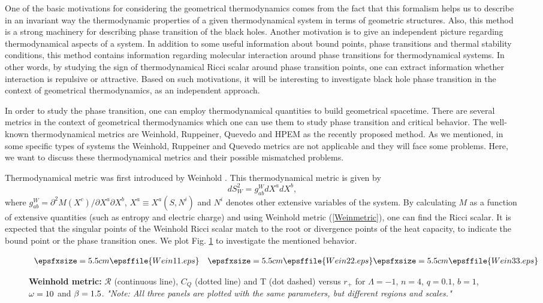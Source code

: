 \documentclass[aps,onecolumn ]{revtex4}
\begin{document}
One of the basic motivations for considering the geometrical
thermodynamics comes from the fact that this formalism helps us to
describe in an invariant way the thermodynamic properties of a
given thermodynamical system in terms of geometric structures.
Also, this method is a strong machinery for describing phase
transition of the black holes. Another motivation is to give an
independent picture regarding thermodynamical aspects of a system.
In addition to some useful information about bound points, phase
transitions and thermal stability conditions, this method contains
information regarding molecular interaction around phase
transitions for thermodynamical systems. In other words, by
studying the sign of thermodynamical Ricci scalar around phase
transition points, one can extract information whether interaction
is repulsive or attractive. Based on such motivations, it will be
interesting to investigate black hole phase transition in the
context of geometrical thermodynamics, as an independent approach.

In order to study the phase transition, one can employ
thermodynamical quantities to build geometrical spacetime. There
are several metrics in the context of geometrical thermodynamics
which one can use them to study phase transition and critical
behavior. The well-known thermodynamical metrics are Weinhold,
Ruppeiner, Quevedo and HPEM as the recently proposed method. As we
mentioned, in some specific types of systems the Weinhold,
Ruppeiner and Quevedo metrics are not applicable and they will
face some problems. Here, we want to discuss these thermodynamical
metrics and their possible mismatched problems.

Thermodynamical metric was first introduced by Weinhold
\cite{Weinhold1,Weinhold2}. This thermodynamical metric is given
by
\begin{equation}
dS_{W}^{2}=g_{ab}^{W}dX^{a}dX^{b},  \label{Weinmetric}
\end{equation}
where $g_{ab}^{W}=\partial ^{2}M\left( X^{c}\right) /\partial
X^{a}\partial X^{b}$, $X^{a}\equiv X^{a}\left( S,N^{i}\right) $
and $N^{i}$ denotes other extensive variables of the system. By
calculating $M$ as a function of extensive quantities (such as
entropy and electric charge) and using Weinhold metric
(\ref{Weinmetric}), one can find the Ricci scalar. It is expected
that the singular points of the Weinhold Ricci scalar match to the
root or divergence points of the heat capacity, to indicate the
bound point or the phase transition ones. We plot Fig. \ref{FigW}
to investigate the mentioned behavior.
\begin{figure}[tbp]
$%
\begin{array}{cc}
\epsfxsize=5.5cm \epsffile{Wein11.eps} & \epsfxsize=5.5cm \epsffile{Wein22.eps} %
\epsfxsize=5.5cm \epsffile{Wein33.eps}%
\end{array}
$%
\caption{\textbf{Weinhold metric:} $\mathcal{R}$ (continuous line), $C_{Q}$
(dotted line) and {T} (dot dashed) versus $r_{+}$ for $\Lambda =-1$, $n=4$, $%
q=0.1$, $b=1$, $\protect\omega =10$ and $\protect\beta =1.5$.
\emph{"Note: All three panels are plotted with the same
parameters, but different regions and scales."}} \label{FigW}
\end{figure}
\end{document}
